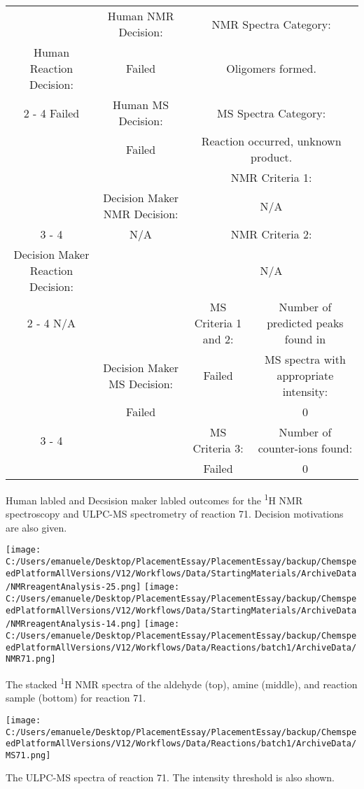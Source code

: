 \documentclass{article}%
\begin{document}
\begin{Decision Table}[H]%
\begin{tabular}{|c|c|c|c|}%
\hline%
&Human NMR Decision:&\multicolumn{2}{|c|}{NMR Spectra Category:}\\%
Human Reaction Decision:&Failed&\multicolumn{2}{|c|}{Oligomers formed.}\\%
\cline{2%
-%
4}%
Failed&Human MS Decision:&\multicolumn{2}{|c|}{MS Spectra Category:}\\%
&Failed&\multicolumn{2}{|c|}{Reaction occurred, unknown product.}\\%
\hline%
&&\multicolumn{2}{|c|}{NMR Criteria 1:}\\%
&Decision Maker NMR Decision:&\multicolumn{2}{|c|}{N/A}\\%
\cline{3%
-%
4}%
&N/A&\multicolumn{2}{|c|}{NMR Criteria 2:}\\%
Decision Maker Reaction Decision:&&\multicolumn{2}{|c|}{N/A}\\%
\cline{2%
-%
4}%
N/A&&MS Criteria 1 and 2:&Number of predicted peaks found in\\%
&Decision Maker MS Decision:&Failed&MS spectra with appropriate intensity:\\%
&Failed&&0\\%
\cline{3%
-%
4}%
&&MS Criteria 3:&Number of counter{-}ions found:\\%
&&Failed&0\\%
\hline%
\end{tabular}%
\caption{Human labled and Decsision maker labled outcomes for the \textsuperscript{1}H NMR spectroscopy and ULPC-MS spectrometry of reaction 71. Decision motivations are also given.}%
\end{Decision Table}%
\begin{NMR Spectra}[H]%
\begin{center}%
\texttt{[image: C:/Users/emanuele/Desktop/PlacementEssay/PlacementEssay/backup/ChemspeedPlatformAllVersions/V12/Workflows/Data/StartingMaterials/ArchiveData/NMRreagentAnalysis-25.png]}\hfill%
\texttt{[image: C:/Users/emanuele/Desktop/PlacementEssay/PlacementEssay/backup/ChemspeedPlatformAllVersions/V12/Workflows/Data/StartingMaterials/ArchiveData/NMRreagentAnalysis-14.png]}\hfill%
\texttt{[image: C:/Users/emanuele/Desktop/PlacementEssay/PlacementEssay/backup/ChemspeedPlatformAllVersions/V12/Workflows/Data/Reactions/batch1/ArchiveData/NMR71.png]}\hfill%
\end{center}%
\caption{The stacked \textsuperscript{1}H NMR spectra of the aldehyde (top), amine (middle), and reaction sample (bottom) for reaction 71.}%
\end{NMR Spectra}%
\begin{MS Spectra}[H]%
\begin{center}%
\texttt{[image: C:/Users/emanuele/Desktop/PlacementEssay/PlacementEssay/backup/ChemspeedPlatformAllVersions/V12/Workflows/Data/Reactions/batch1/ArchiveData/MS71.png]}\hfill%
\end{center}%
\caption{The ULPC-MS spectra of reaction 71. The intensity threshold is also shown.}%
\end{MS Spectra}%
\end{document}
